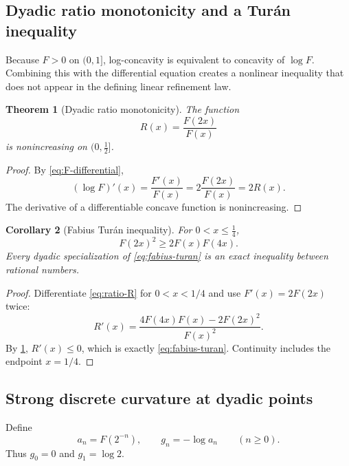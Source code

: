 \documentclass[11pt,oneside]{article}
\newtheorem{theorem}{Theorem}[section]
\newtheorem{corollary}[theorem]{Corollary}
\theoremstyle{definition}
\theoremstyle{remark}
\numberwithin{equation}{section}
\begin{document}
\subsection{Dyadic ratio monotonicity and a Tur\'an inequality}
Because $F>0$ on $(0,1]$, log-concavity is equivalent to concavity of
$\log F$.  Combining this with the differential equation creates a nonlinear
inequality that does not appear in the defining linear refinement law.

\begin{theorem}[Dyadic ratio monotonicity]
\label{thm:ratio-monotone}
The function
\begin{equation}
 R(x)=\frac{F(2x)}{F(x)}
 \label{eq:ratio-R}
\end{equation}
is nonincreasing on $(0,\tfrac12]$.
\end{theorem}

\begin{proof}
By \cref{eq:F-differential},
\[
 (\log F)'(x)=\frac{F'(x)}{F(x)}=2\frac{F(2x)}{F(x)}=2R(x).
\]
The derivative of a differentiable concave function is nonincreasing.
\end{proof}

\begin{corollary}[Fabius Tur\'an inequality]
\label{cor:fabius-turan}
For $0<x\le\tfrac14$,
\begin{equation}
 \boxed{F(2x)^2\ge 2F(x)F(4x).}
 \label{eq:fabius-turan}
\end{equation}
Every dyadic specialization of \cref{eq:fabius-turan} is an exact inequality
between rational numbers.
\end{corollary}

\begin{proof}
Differentiate \cref{eq:ratio-R} for $0<x<1/4$ and use
$F'(x)=2F(2x)$ twice:
\[
 R'(x)=\frac{4F(4x)F(x)-2F(2x)^2}{F(x)^2}.
\]
By \cref{thm:ratio-monotone}, $R'(x)\le0$, which is exactly
\cref{eq:fabius-turan}.  Continuity includes the endpoint $x=1/4$.
\end{proof}

\subsection{Strong discrete curvature at dyadic points}
Define
\begin{equation}
 a_n=F(2^{-n}),\qquad g_n=-\log a_n \qquad(n\ge0).
 \label{eq:dyadic-action}
\end{equation}
Thus $g_0=0$ and $g_1=\log2$.
\end{document}
